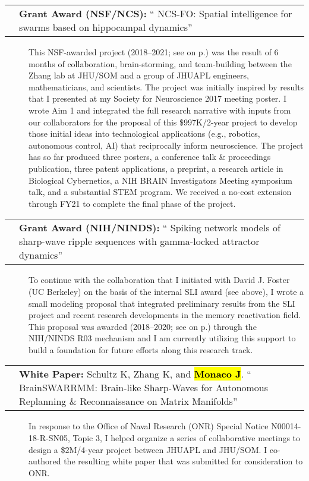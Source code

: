 \documentclass[10pt]{article}
\makeatletter
\newcommand{\unpubtitle}[1]{{\color{hopkinsblue} #1}}
\newcommand{\joehl}[1]{\hl{\textbf{#1}}}
\newcommand{\researchnote}[1]{
  \begin{description}
    \item[] {\hspace{2.2ex}\color{darkgray} #1}
  \end{description}
}
\newcommand{\researchactivity}[4]{
  \begin{minipage}[t]{\textwidth}
    \begin{tabular}{@{\hspace{2ex}}l>{\raggedright\arraybackslash}p{.8\textwidth}}
      \makebox[1.2in][l]{#1} & \textbf{#2:}
      ``\unpubtitle{#3}'' 
    \end{tabular}
  \researchnote{\hspace{1ex} #4}
  \end{minipage}
  \medbreak
}
\newcommand{\whitepaper}[4]{
  \begin{minipage}[t]{\textwidth}
    \begin{tabular}{@{\hspace{2ex}}l>{\raggedright\arraybackslash}p{.8\textwidth}}
      \makebox[1.2in][l]{#1} & \textbf{White Paper:} #2.
      ``\unpubtitle{#3}'' 
    \end{tabular}
  \researchnote{\hspace{1ex} #4}
  \end{minipage}
  \medbreak
}
\makeatother
\begin{document}
\researchactivity
{Nov. 2017--2021}
{Grant Award (NSF/NCS)}
{NCS-FO: Spatial intelligence for swarms based on hippocampal dynamics}
{This NSF-awarded project (2018--2021; see \emph{\nameref{sec:funding}}
  on p.\pageref{sec:funding}) was the result of 6 months of collaboration,
  brain-storming, and team-building between the Zhang lab at JHU/SOM and a group
  of JHUAPL engineers, mathematicians, and scientists. The project was initially
  inspired by results that I presented at my Society for Neuroscience 2017 meeting
  poster. I wrote Aim 1 and integrated the full research narrative with inputs
  from our collaborators for the proposal of this \$997K/2-year project to develop
  those initial ideas into technological applications (e.g., robotics, autonomous
  control, AI) that reciprocally inform neuroscience. The project has so far
  produced three posters, a conference talk \& proceedings publication, three
  patent applications, a preprint, a research article in Biological Cybernetics, a
  NIH BRAIN Investigators Meeting symposium talk, and a substantial STEM program.
  We received a no-cost extension through FY21 to complete the final phase of the
project.}
\label{sec:nsf}

\researchactivity
{Jan. 2018--2020}
{Grant Award (NIH/NINDS)}
{Spiking network models of sharp-wave ripple sequences with gamma-locked
attractor dynamics}
{To continue with the collaboration that I initiated with David J. Foster
  (UC Berkeley) on the basis of the internal SLI award (see above), I wrote
  a small modeling proposal that integrated preliminary results from the SLI
  project and recent research developments in the memory reactivation field.
  This proposal was awarded (2018--2020; see \emph{\nameref{sec:funding}}
  on p.\pageref{sec:funding}) through the NIH/NINDS R03 mechanism and I am
  currently utilizing this support to build a foundation for future efforts along
this research track.}
\label{sec:nih}

\whitepaper
{Feb.--Mar. 2018}
{Schultz K, Zhang K, and \joehl{Monaco J}}
{BrainSWARRMM: Brain-like Sharp-Waves for Autonomous Replanning \&
Reconnaissance on Matrix Manifolds}
{In response to the Office of Naval Research (ONR) Special Notice
  N00014-18-R-SN05, Topic 3, I helped organize a series of collaborative meetings
  to design a \$2M/4-year project between JHUAPL and JHU/SOM. I co-authored the
resulting white paper that was submitted for consideration to ONR.}
\end{document}
